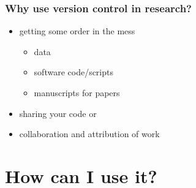 \documentclass{beamer}
\begin{document}
\begin{frame}
\frametitle{Why use version control in research?}

\begin{itemize}
\item getting some order in the mess
\begin{itemize}
\item data
\item software code/scripts
\item manuscripts for papers 
\end{itemize}

\item sharing your code or 

\item collaboration and attribution of work
\end{itemize}

\end{frame}

\section{How can I use it?}
\end{document}
